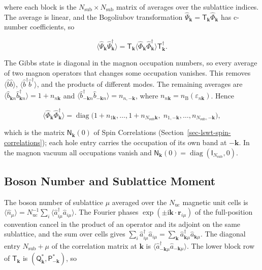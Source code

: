 where each block is the \(N_{\mathrm{sub}}\times N_{\mathrm{sub}}\) matrix of averages over the sublattice indices. The average is linear, and the Bogoliubov transformation \(\hat\Psi_{\mathbf k}=\mathsf T_{\mathbf k}\hat\Phi_{\mathbf k}\) has c-number coefficients, so

\[
\big\langle\hat\Psi_{\mathbf k}\hat\Psi_{\mathbf k}^\dagger\big\rangle
=\mathsf T_{\mathbf k}\big\langle\hat\Phi_{\mathbf k}\hat\Phi_{\mathbf k}^\dagger\big\rangle\mathsf T_{\mathbf k}^\dagger.
\]

The Gibbs state is diagonal in the magnon occupation numbers, so every average of two magnon operators that changes some occupation vanishes. This removes \(\langle\hat b\hat b\rangle\), \(\langle\hat b^\dagger\hat b^\dagger\rangle\), and the products of different modes. The remaining averages are \(\langle\hat b_{\mathbf kn}\hat b_{\mathbf kn}^\dagger\rangle=1+n_{n\mathbf k}\) and \(\langle\hat b_{-\mathbf kn}^\dagger\hat b_{-\mathbf kn}\rangle=n_{n,-\mathbf k}\), where \(n_{n\mathbf k}=n_{\mathrm B}(\varepsilon_{n\mathbf k})\). Hence

\[
\big\langle\hat\Phi_{\mathbf k}\hat\Phi_{\mathbf k}^\dagger\big\rangle
=\operatorname{diag}\big(1+n_{1\mathbf k},\ldots,1+n_{N_{\mathrm{sub}}\mathbf k},\;n_{1,-\mathbf k},\ldots,n_{N_{\mathrm{sub}},-\mathbf k}\big),
\]

which is the matrix \(\mathsf N_{\mathbf k}(0)\) of Spin Correlations (Section~\ref{sec-lswt-spin-correlations}); each hole entry carries the occupation of its own band at \(-\mathbf k\). In the magnon vacuum all occupations vanish and \(\mathsf N_{\mathbf k}(0)=\operatorname{diag}(\mathsf I_{N_{\mathrm{sub}}},0)\).

\subsection{Boson Number and Sublattice Moment}

The boson number of sublattice \(\mu\) averaged over the \(N_{\mathrm{uc}}\) magnetic unit cells is \(\langle\hat n_\mu\rangle=N_{\mathrm{uc}}^{-1}\sum_i\langle\hat a_{i\mu}^\dagger\hat a_{i\mu}\rangle\). The Fourier phases \(\exp(\pm\mathrm i\mathbf k\cdot\mathbf r_{i\mu})\) of the full-position convention cancel in the product of an operator and its adjoint on the same sublattice, and the sum over cells gives \(\sum_i\hat a_{i\mu}^\dagger\hat a_{i\mu}=\sum_{\mathbf k}\hat a_{\mathbf k\mu}^\dagger\hat a_{\mathbf k\mu}\). The diagonal entry \(N_{\mathrm{sub}}+\mu\) of the correlation matrix at \(\mathbf k\) is \(\langle\hat a_{-\mathbf k\mu}^\dagger\hat a_{-\mathbf k\mu}\rangle\). The lower block row of \(\mathsf T_{\mathbf k}\) is \((\mathsf Q_{\mathbf k}^*,\mathsf P_{-\mathbf k}^*)\), so

